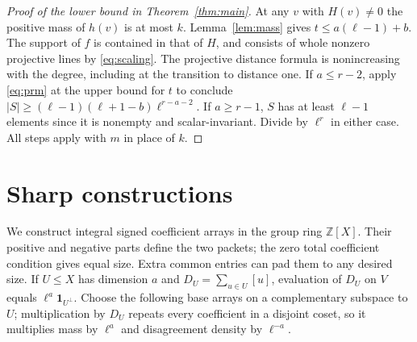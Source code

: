 \documentclass[11pt]{article}
\theoremstyle{remark}\newtheorem{remark}[theorem]{Remark}
\newcommand{\Z}{\mathbb Z}
\newcommand{\one}{\mathbf 1}
\begin{document}
\begin{proof}[Proof of the lower bound in Theorem~\ref{thm:main}]
At any $v$ with $H(v)\ne0$ the positive mass of $h(v)$ is at most $k$. Lemma~\ref{lem:mass} gives $t\le a(\ell-1)+b$. The support of $f$ is contained in that of $H$, and consists of whole nonzero projective lines by \eqref{eq:scaling}. The projective distance formula is nonincreasing with the degree, including at the transition to distance one. If $a\le r-2$, apply \eqref{eq:prm} at the upper bound for $t$ to conclude $|S|\ge(\ell-1)(\ell+1-b)\ell^{r-a-2}$. If $a\ge r-1$, $S$ has at least $\ell-1$ elements since it is nonempty and scalar-invariant. Divide by $\ell^r$ in either case. All steps apply with $m$ in place of $k$.
\end{proof}

\section{Sharp constructions}
We construct integral signed coefficient arrays in the group ring $\Z[X]$. Their positive and negative parts define the two packets; the zero total coefficient condition gives equal size. Extra common entries can pad them to any desired size. If $U\le X$ has dimension $a$ and $D_U=\sum_{u\in U}[u]$, evaluation of $D_U$ on $V$ equals $\ell^a\one_{U^\perp}$. Choose the following base arrays on a complementary subspace to $U$; multiplication by $D_U$ repeats every coefficient in a disjoint coset, so it multiplies mass by $\ell^a$ and disagreement density by $\ell^{-a}$.
\end{document}
